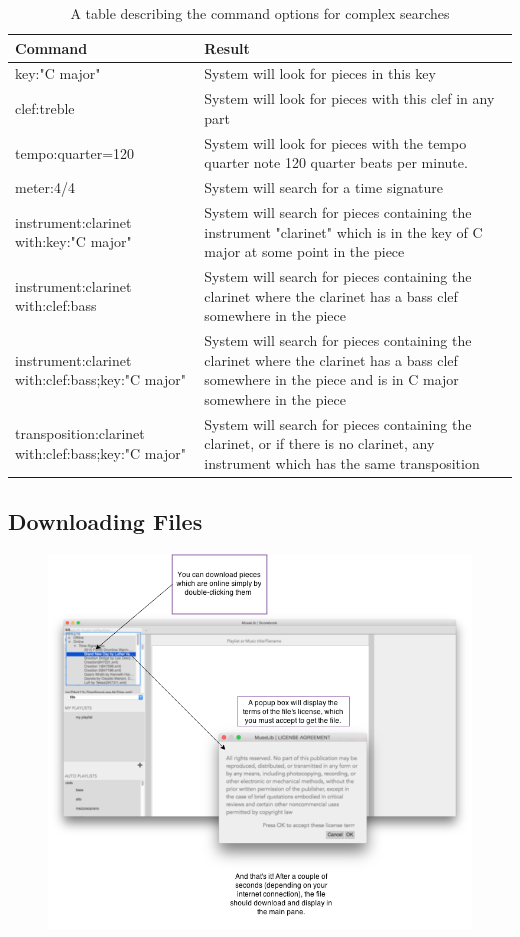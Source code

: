 \begin{table}[H]
\begin{tabu} to 1.05\textwidth {| X[l] | X[l] |} \hline
{\textbf{Command}} & {\textbf{Result}} \\ \hline
key:"C major" & System will look for pieces in this key \\ \hline
clef:treble & System will look for pieces with this clef in any part \\ \hline
tempo:quarter=120 & System will look for pieces with the tempo quarter note 120 quarter beats per minute. \\ \hline
meter:4/4 & System will search for a time signature \\ \hline
instrument:clarinet with:key:"C major" & System will search for pieces containing the instrument "clarinet" which is in the key of C major at some point in the piece \\ \hline
instrument:clarinet with:clef:bass & System will search for pieces containing the clarinet where the clarinet has a bass clef somewhere in the piece \\ \hline
instrument:clarinet with:clef:bass;key:"C major" & System will search for pieces containing the clarinet where the clarinet has a bass clef somewhere in the piece and is in C major somewhere in the piece \\ \hline
transposition:clarinet with:clef:bass;key:"C major" & System will search for pieces containing the clarinet, or if there is no clarinet, any instrument which has the same transposition \\ \hline
\end{tabu}
\caption{A table describing the command options for complex searches}
\label{table:commands_complex}
\end{table}

\subsection{Downloading Files}
\begin{figure}[H]
\centering
\includegraphics[width=500pt]{downloading}
\end{figure}


